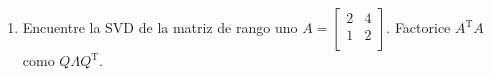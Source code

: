 \documentclass[12pt,a4paper]{article}
\newcommand{\bi}[1]{\hbox{\boldmath$#1$}}
\newcommand\1{\mbox{\,\vrule height-0.8pt depth1.0pt width2pc\,}}
\newcommand\2{\mbox{\,\vrule height-0.8pt depth1.0pt width1pc\,}}
\DeclareRobustCommand\transp{^{\mathrm{T}}}
\begin{document}
\begin{enumerate}


\item Encuentre la  SVD  de la matriz de rango  uno $A=\left[\begin{array}{cc}2&4\\1&2\\\end{array}\right]$. Factorice $A\transp A$ como $Q\Lambda Q\transp$.

%
%
%

\end{enumerate}
\end{document}

